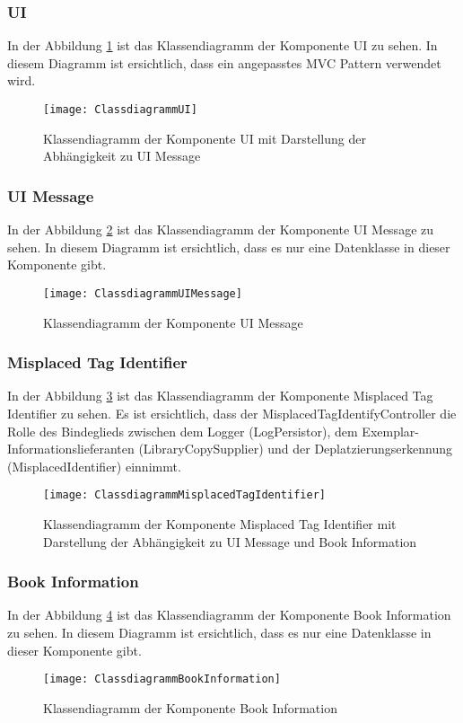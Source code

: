 \clearpage
\subsubsection{UI}
In der Abbildung \ref{fig:ClassUI} ist das Klassendiagramm der Komponente UI zu sehen.
In diesem Diagramm ist ersichtlich, dass ein angepasstes MVC Pattern verwendet wird.
\begin{figure}[htb]
	\centering
	\texttt{[image: ClassdiagrammUI]}
	\caption{Klassendiagramm der Komponente UI mit Darstellung der Abhängigkeit zu UI Message}
	\label{fig:ClassUI}
\end{figure}
\subsubsection{UI Message}
In der Abbildung \ref{fig:ClassUIMessage} ist das Klassendiagramm der Komponente UI Message zu sehen.
In diesem Diagramm ist ersichtlich, dass es nur eine Datenklasse in dieser Komponente gibt.
\begin{figure}[htb]
	\centering
	\texttt{[image: ClassdiagrammUIMessage]}
	\caption{Klassendiagramm der Komponente UI Message}
	\label{fig:ClassUIMessage}
\end{figure}

\clearpage
\subsubsection{Misplaced Tag Identifier}
In der Abbildung \ref{fig:ClassMisplacedTagIdentifier} ist das Klassendiagramm der Komponente Misplaced Tag Identifier zu sehen.
Es ist ersichtlich, dass der MisplacedTagIdentifyController die Rolle des Bindeglieds zwischen dem Logger (LogPersistor), dem Exemplar-Informationslieferanten (LibraryCopySupplier) und der Deplatzierungserkennung (MisplacedIdentifier) einnimmt.
\begin{figure}[htb]
	\centering
	\texttt{[image: ClassdiagrammMisplacedTagIdentifier]}
	\caption{Klassendiagramm der Komponente Misplaced Tag Identifier mit Darstellung der Abhängigkeit zu UI Message und Book Information}
	\label{fig:ClassMisplacedTagIdentifier}
\end{figure}

\subsubsection{Book Information}
In der Abbildung \ref{fig:ClassBookInformation} ist das Klassendiagramm der Komponente Book Information zu sehen.
In diesem Diagramm ist ersichtlich, dass es nur eine Datenklasse in dieser Komponente gibt.
\begin{figure}[htb]
	\centering
	\texttt{[image: ClassdiagrammBookInformation]}
	\caption{Klassendiagramm der Komponente Book Information}
	\label{fig:ClassBookInformation}
\end{figure}

